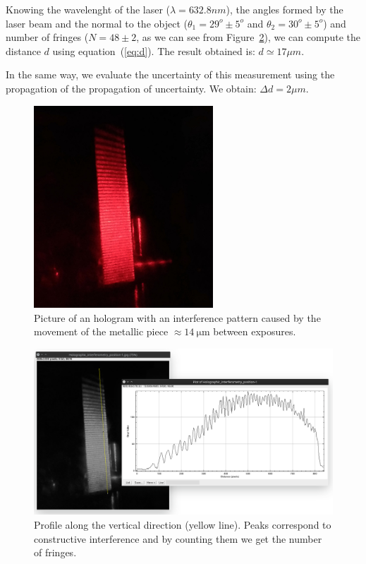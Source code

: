 \documentclass[11pt,a4paper]{article}
\begin{document}
Knowing the wavelenght of the laser ($\lambda =632.8nm$), the angles formed by the laser beam and the normal to the object ($\theta_1 =29^o \pm 5^o$ and $\theta_2 =30^o \pm 5^o$) and number of fringes ($N=48 \pm 2$, as we can see from Figure~\ref{fig:holographic_interferometry_position_fringes}), we can compute the distance $d$ using equation~(\ref{eq:d}). The result obtained is: $d \simeq 17\mu m$.

In the same way, we evaluate the uncertainty of this measurement using the propagation of the propagation of uncertainty. We obtain: $\Delta d=2\mu m$.

\begin{figure}[ht]
\centering
\includegraphics[width=0.6\textwidth]{Holographic_interferometry_position}
\caption{Picture of an hologram with an interference pattern caused by the movement of the metallic piece $\approx\SI{14}{\micro \m}$ between exposures.}
\label{fig:holographic_interferometry_position}
\end{figure}

\begin{figure}[ht]
\centering
\includegraphics[width=\textwidth]{Holographic_interferometry_position_fringes}
\caption{Profile along the vertical direction (yellow line). Peaks correspond to constructive interference and by counting them we get the number of fringes.}
\label{fig:holographic_interferometry_position_fringes}
\end{figure}
\end{document}
